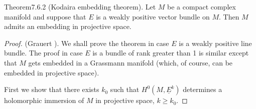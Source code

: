 \begin{originaltheorem}{Theorem}{7.6.2}
(Kodaira embedding theorem). Let $M$ be a compact complex manifold and suppose that $E$ is a weakly positive vector bundle on $M$. Then $M$ admits an embedding in projective space.
\end{originaltheorem}
\begin{proof}
(Grauert \cite{bib:II:grauert-h:1}). We shall prove the theorem in case $E$ is a weakly positive line bundle. The proof in case $E$ is a bundle of rank greater than 1 is similar except that $M$ gets embedded in a Grassmann manifold (which, of course, can be embedded in projective space).

First we show that there exists $k_0$ such that $H^0(M,\underline{E}^k)$ determines a holomorphic immersion of $M$ in projective space, $k\geq k_0$.


\end{proof}
